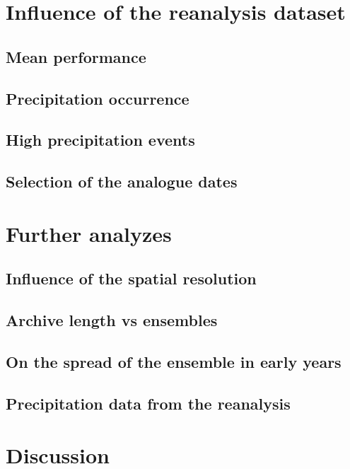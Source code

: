 \documentclass{ametsoc}
\begin{document}
\section{Influence of the reanalysis dataset}

\subsection{Mean performance}

\subsection{Precipitation occurrence}

\subsection{High precipitation events}

\subsection{Selection of the analogue dates}


\section{Further analyzes}

\subsection{Influence of the spatial resolution}

\subsection{Archive length vs ensembles}

\subsection{On the spread of the ensemble in early years}



\subsection{Precipitation data from the reanalysis}


\section{Discussion}
\end{document}
